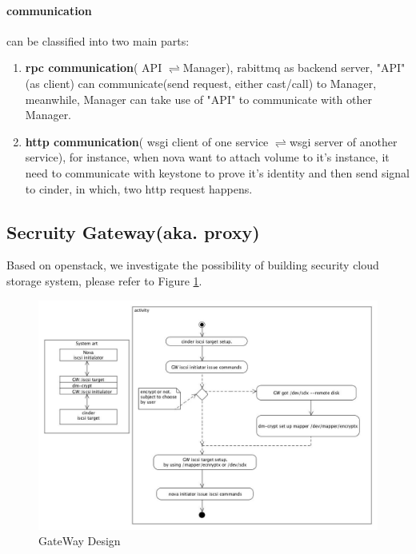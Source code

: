 \documentclass[10pt]{report}
\begin{document}
			\paragraph{\large communication} can be classified into  two main parts:
			\begin{enumerate}[$\bullet$]
				\item  \textbf{rpc communication}( API $\rightleftharpoons $Manager), rabittmq as backend server, "API"(as client) can communicate(send request, either cast/call) to Manager, meanwhile, Manager can take use of "API" to communicate with other Manager. 
				\item  \textbf{http communication}( wsgi client of one service $\rightleftharpoons $wsgi server of another service), for instance, when nova want to attach volume to it's instance, it need to communicate with keystone to prove it's identity and then send signal to cinder, in which, two http request happens.
			\end{enumerate}
			\subsection{Secruity Gateway(aka. proxy)}
			Based on openstack, we investigate the possibility of building security cloud storage system, please refer to Figure \ref{iscsiplan}. 
			\begin{figure}[fhtbp]
				\includegraphics[width=\textwidth,height=\textheight,keepaspectratio] {iscsi(plan)}
				\caption{GateWay Design}
				\label{iscsiplan}
			\end{figure}
			\newpage
\end{document}
